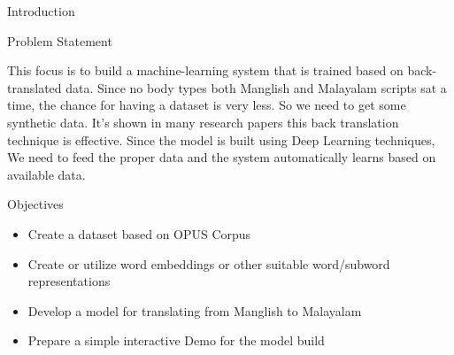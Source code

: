 \begin{chapter}{Introduction}
\begin{section}{Problem Statement}
        \par This focus is to build a machine-learning system that is trained based on back-translated data. Since no body types both Manglish and Malayalam scripts sat a time, the chance for having a dataset is very less. So we need to get some synthetic data. It's shown in many research papers this back translation technique is effective. Since the model is built using Deep Learning techniques, We need to feed the proper data and the system automatically learns based on available data.
        \begin{subsection}{Objectives}
            \begin{itemize}
  \item Create a dataset based on OPUS Corpus
  \item Create or utilize word embeddings or other suitable word/subword representations
  \item Develop a model for translating from Manglish to Malayalam
  \item Prepare a simple interactive Demo for the model build
\end{itemize}
        \end{subsection}
    \end{section}


\end{chapter}
